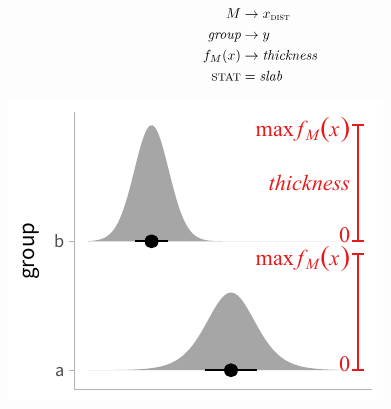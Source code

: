 \documentclass[journal]{vgtc}                     %
\newcommand{\equationfigure}[2]{%
\noindent
\begin{minipage}{.5\columnwidth}
\setlength{\abovedisplayskip}{0pt}
\setlength{\belowdisplayskip}{0pt}
#1\end{minipage}%
\begin{minipage}{.4\columnwidth}\centering #2 \end{minipage}%
\vspace{.5\belowdisplayskip}\\
}
\begin{document}
\equationfigure{
\begin{align*}
M &\rightarrow x_\textsc{dist}\\
\textit{group} &\rightarrow y\\
f_M(x) &\rightarrow \textit{thickness}\\
\textsc{stat} &= \mathit{slab}
\end{align*}
}{\includegraphics[width=1.2\columnwidth]{figs/3-slab_density_two_groups.pdf}}
\end{document}

